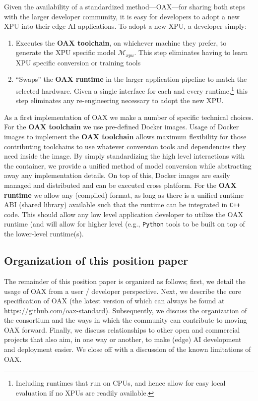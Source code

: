 \documentclass{article}
\newcommand{\oaxgit}{\href{https://github.com/oax-standard}{https://github.com/oax-standard}}
\begin{document}
Given the availability of a standardized method---OAX---for sharing both steps with the larger developer community, it is easy for developers to adopt a new XPU into their edge AI applications. To adopt a new XPU, a developer simply:
\begin{enumerate}
\item Executes the \textbf{OAX toolchain}, on whichever machine they prefer, to generate the XPU specific model $\mathcal{M}_{xpu}$. This step eliminates having to learn XPU specific conversion or training tools
\item ``Swaps'' the \textbf{OAX runtime} in the larger application pipeline to match the selected hardware. Given a single interface for each and every runtime,\footnote{Including runtimes that run on CPUs, and hence allow for easy local evaluation if no XPUs are readily available.} this step eliminates any re-engineering necessary to adopt the new XPU.
\end{enumerate}

As a first implementation of OAX we make a number of specific technical choices. For the \textbf{OAX toolchain} we use pre-defined Docker images. Usage of Docker images to implement the  \textbf{OAX toolchain} allows maximum flexibility for those contributing toolchains to use whatever conversion tools and dependencies they need inside the image. By simply standardizing the high level interactions with the container, we provide a unified method of model conversion while abstracting away any implementation details. On top of this, Docker images are easily managed and distributed and can be executed cross platform. For the  \textbf{OAX runtime} we allow any (compiled) format, as long as there is a unified runtime ABI (shared library) available such that the runtime can be integrated in \texttt{C++} code. This should allow any low level application developer to utilize the OAX runtime (and will allow for higher level (e.g., \texttt{Python} tools to be built on top of the lower-level runtime(s).

\subsection{Organization of this position paper}

The remainder of this position paper is organized as follows; first, we detail the usage of OAX from a user / developer perspective. Next, we describe the core specification of OAX (the latest version of which can always be found at \oaxgit). Subsequently, we discuss the organization of the consortium and the ways in which the community can contribute to moving OAX forward. Finally, we discuss relationships to other open and commercial projects that also aim, in one way or another, to make (edge) AI development and deployment easier. We close off with a discussion of the known limitations of OAX.
\end{document}

